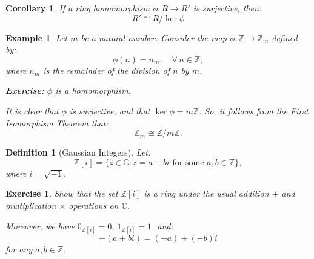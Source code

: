 \documentclass[a4paper,12pt]{report}
\newcommand{\ZZ}{\mathbb{Z}}
\newcommand{\ra}{\longrightarrow}
\newcounter{statement}
\numberwithin{statement}{chapter}
\newtheorem{defn}[statement]{Definition}
\newtheorem{cor}[statement]{Corollary}
\newtheorem{eg}[statement]{\bf Example}
\newtheorem{ex}[statement]{\bf Exercise}
\numberwithin{equation}{chapter}
\numberwithin{section}{chapter}
\numberwithin{subsection}{section}
\begin{document}
\begin{cor}
If a ring homomorphism $\phi : R \ra R'$ is surjective, then:
\[
R' \cong R/\ker \phi
\]
\end{cor}




\begin{eg}
Let $m$ be a natural number.
Consider the map $\phi : \mathbb{Z} \ra \ZZ_m$ defined by:
\[
\phi(n) = {n}_m, \quad \forall\, n \in \mathbb{Z},
\]
where ${n}_m$ is the remainder of the division of $n$ by $m$.




 {\bf Exercise:}  $\phi$ is a homomorphism.




It is clear that $\phi$ is surjective, and that $\ker \phi = m\ZZ$.
So, it follows from the First Isomorphism Theorem that:
\[
\ZZ_m \cong \ZZ/m\ZZ.
\]
\end{eg}

\begin{defn}[Gaussian Integers]


Let:
\[
\mathbb{Z}[i] = \{z \in \mathbb{C}: z = a + bi \text{ for some } a, b \in \mathbb{Z}\},
\]
where $i = \sqrt{-1}$.
\end{defn}
\begin{ex}

Show that the set $\mathbb{Z}[i]$ is a ring under the usual addition $+$
and multiplication $\times$ operations on $\mathbb{C}$.



Moreover, we have $0_{\mathbb{Z}[i]} = 0$, $1_{\mathbb{Z}[i]} = 1$,
and:
\[
-(a + bi) = (-a) + (-b) i
\]
for any $a, b \in \mathbb{Z}$.
\end{ex}
\end{document}
